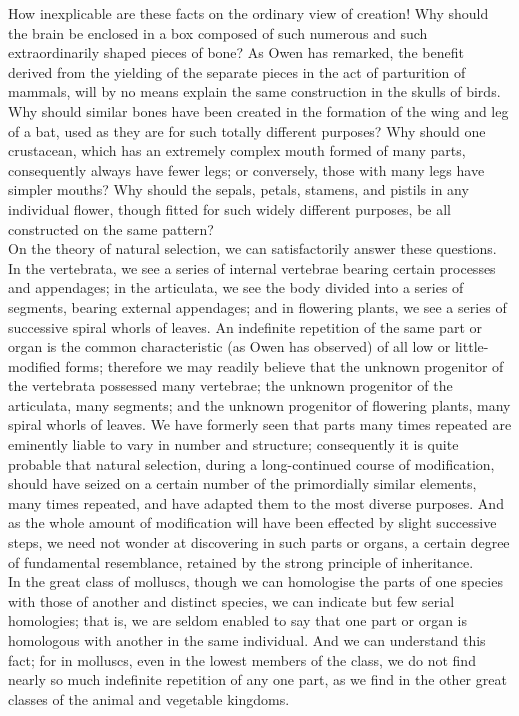 \indent How inexplicable are these facts on the ordinary view of creation! Why should the brain be enclosed in a box composed of such numerous and such extraordinarily shaped pieces of bone? As Owen has remarked, the benefit derived from the yielding of the separate pieces in the act of parturition of mammals, will by no means explain the same construction in the skulls of birds. Why should similar bones have been created in the formation of the wing and leg of a bat, used as they are for such totally different purposes? Why should one crustacean, which has an extremely complex mouth formed of many parts, consequently always have fewer legs; or conversely, those with many legs have simpler mouths? Why should the sepals, petals, stamens, and pistils in any individual flower, though fitted for such widely different purposes, be all constructed on the same pattern?~\\
\indent On the theory of natural selection, we can satisfactorily answer these questions. In the vertebrata, we see a series of internal vertebrae bearing certain processes and appendages; in the articulata, we see the body divided into a series of segments, bearing external appendages; and in flowering plants, we see a series of successive spiral whorls of leaves. An indefinite repetition of the same part or organ is the common characteristic (as Owen has observed) of all low or little-modified forms; therefore we may readily believe that the unknown progenitor of the vertebrata possessed many vertebrae; the unknown progenitor of the articulata, many segments; and the unknown progenitor of flowering plants, many spiral whorls of leaves. We have formerly seen that parts many times repeated are eminently liable to vary in number and structure; consequently it is quite probable that natural selection, during a long-continued course of modification, should have seized on a certain number of the primordially similar elements, many times repeated, and have adapted them to the most diverse purposes. And as the whole amount of modification will have been effected by slight successive steps, we need not wonder at discovering in such parts or organs, a certain degree of fundamental resemblance, retained by the strong principle of inheritance.~\\
\indent In the great class of molluscs, though we can homologise the parts of one species with those of another and distinct species, we can indicate but few serial homologies; that is, we are seldom enabled to say that one part or organ is homologous with another in the same individual. And we can understand this fact; for in molluscs, even in the lowest members of the class, we do not find nearly so much indefinite repetition of any one part, as we find in the other great classes of the animal and vegetable kingdoms.~\\
